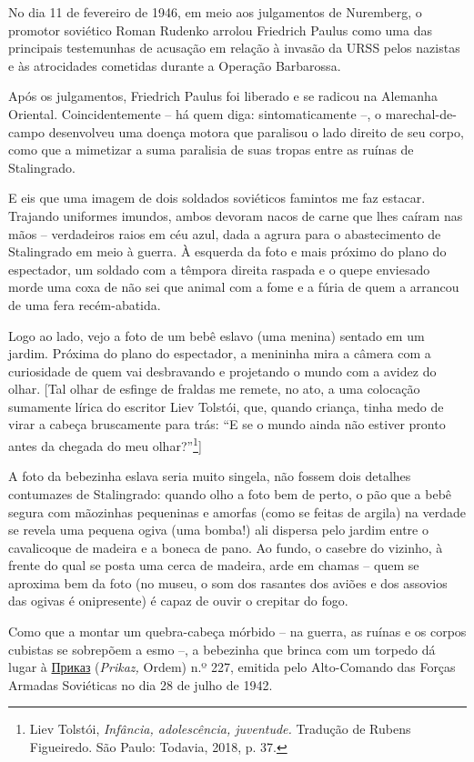 No dia 11 de fevereiro de 1946, em meio aos julgamentos de Nuremberg, o
promotor soviético Roman Rudenko arrolou Friedrich Paulus como uma das
principais testemunhas de acusação em relação à invasão da URSS pelos
nazistas e às atrocidades cometidas durante a Operação Barbarossa.

Após os julgamentos, Friedrich Paulus foi liberado e se radicou na
Alemanha Oriental. Coincidentemente -- há quem diga: sintomaticamente
--, o marechal-de-campo desenvolveu uma doença motora que paralisou o
lado direito de seu corpo, como que a mimetizar a suma paralisia de suas
tropas entre as ruínas de Stalingrado.

E eis que uma imagem de dois soldados soviéticos famintos me faz
estacar. Trajando uniformes imundos, ambos devoram nacos de carne que
lhes caíram nas mãos -- verdadeiros raios em céu azul, dada a agrura
para o abastecimento de Stalingrado em meio à guerra. À esquerda da foto
e mais próximo do plano do espectador, um soldado com a têmpora direita
raspada e o quepe enviesado morde uma coxa de não sei que animal com a
fome e a fúria de quem a arrancou de uma fera recém-abatida.

Logo ao lado, vejo a foto de um bebê eslavo (uma menina) sentado em um
jardim. Próxima do plano do espectador, a menininha mira a câmera com a
curiosidade de quem vai desbravando e projetando o mundo com a avidez do
olhar. {[}Tal olhar de esfinge de fraldas me remete, no ato, a uma
colocação sumamente lírica do escritor Liev Tolstói, que, quando
criança, tinha medo de virar a cabeça bruscamente para trás: ``E se o
mundo ainda não estiver pronto antes da chegada do meu
olhar?''\footnote{Liev Tolstói, \emph{Infância, adolescência,
  juventude.} Tradução de Rubens Figueiredo. São Paulo: Todavia, 2018,
  p. 37.}{]}

A foto da bebezinha eslava seria muito singela, não fossem dois detalhes
contumazes de Stalingrado: quando olho a foto bem de perto, o pão que a
bebê segura com mãozinhas pequeninas e amorfas (como se feitas de
argila) na verdade se revela uma pequena ogiva (uma bomba!) ali dispersa
pelo jardim entre o cavalicoque de madeira e a boneca de pano. Ao fundo,
o casebre do vizinho, à frente do qual se posta uma cerca de madeira,
arde em chamas -- quem se aproxima bem da foto (no museu, o som dos
rasantes dos aviões e dos assovios das ogivas é onipresente) é capaz de
ouvir o crepitar do fogo.

Como que a montar um quebra-cabeça mórbido -- na guerra, as ruínas e os
corpos cubistas se sobrepõem a esmo --, a bebezinha que brinca com um
torpedo dá lugar à
\href{https://ru.wikipedia.org/wiki/\%D0\%9F\%D1\%80\%D0\%B8\%D0\%BA\%D0\%B0\%D0\%B7_\%E2\%84\%96_227}{Приказ}
(\emph{Prikaz,} Ordem) n.º 227, emitida pelo Alto-Comando das Forças
Armadas Soviéticas no dia 28 de julho de 1942.

